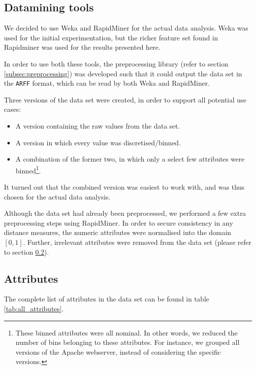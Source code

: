 \subsection{Datamining tools}
\label{subsec:weka}


We decided to use Weka and RapidMiner for the actual data analysis. Weka was used for the initial experimentation, but the richer feature set found in Rapidminer was used for the results presented here. 

In order to use both these tools, the preprocessing library (refer to section \ref{subsec:preprocessing}) was developed such that it could output the data set in the \texttt{ARFF} format, which can be read by both Weka and RapidMiner.

Three versions of the data set were created, in order to support all potential use cases:

\begin{itemize}
\item A version containing the raw values from the data set.
\item A version in which every value was discretised/binned.
\item A combination of the former two, in which only a select few attributes were binned\footnote{These binned attributes were all nominal. In other words, we reduced the number of bins belonging to these attributes. For instance, we grouped all versions of the Apache webserver, instead of considering the specific versions.}.
\end{itemize}

It turned out that the combined version was easiest to work with, and was thus chosen for the actual data analysis.

Although the data set had already been preprocessed, we performed a few extra preprocessing steps using RapidMiner. In order to secure consistency in any distance measures, the numeric attributes were normalised into the domain $[0, 1]$. Further, irrelevant attributes were removed from the data set (please refer to section \ref{subsec:attributes}).

\subsection{Attributes}
\label{subsec:attributes}

The complete list of attributes in the data set can be found in table \ref{tab:all_attributes}.


